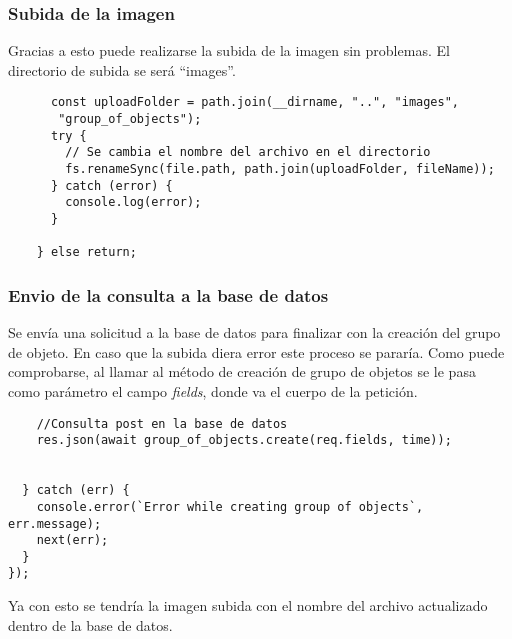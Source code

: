 \subsubsection{Subida de la imagen}
Gracias a esto puede realizarse la subida de la imagen sin problemas. El directorio de subida se será ``images''.

\begin{verbatim}
      const uploadFolder = path.join(__dirname, "..", "images",
       "group_of_objects");
      try {
        // Se cambia el nombre del archivo en el directorio
        fs.renameSync(file.path, path.join(uploadFolder, fileName));
      } catch (error) {
        console.log(error);
      }

    } else return;
\end{verbatim}

\subsubsection{Envio de la consulta a la base de datos}
Se envía una solicitud a la base de datos para finalizar con la creación del grupo de objeto. En caso que la subida diera error este proceso se pararía. Como puede comprobarse, al llamar al método de creación de grupo de objetos se le pasa como parámetro el campo \textit{fields}, donde va el cuerpo de la petición.

\begin{verbatim}
    //Consulta post en la base de datos
    res.json(await group_of_objects.create(req.fields, time));


  } catch (err) {
    console.error(`Error while creating group of objects`, err.message);
    next(err);
  }
});
\end{verbatim}

Ya con esto se tendría la imagen subida con el nombre del archivo actualizado dentro de la base de datos.
